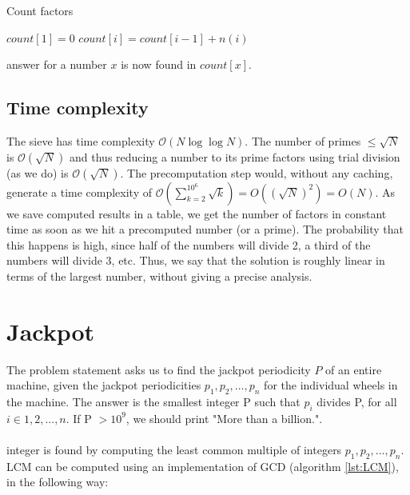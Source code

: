 \documentclass[11pt,a4paper,twoside]{article}
\begin{document}

\begin{algorithm}
    \caption{Count factors}
    \label{factorcount}
    \begin{algorithmic}
        \STATE $count[1] = 0$
            \STATE $count[i] = count[i-1] + n(i)$
        \ENDFOR
    \end{algorithmic}
\end{algorithm}

 answer for a number $x$ is now found in $count[x]$. 
\subsection{Time complexity}
The sieve has time complexity $\mathcal{O}(N\log{\log{N}})$. The number of
primes $\le \sqrt{N}$ is $\mathcal{O}(\sqrt{N})$ and thus reducing a number to
its prime factors using trial division (as we do) is $\mathcal{O}(\sqrt{N})$.
The precomputation step would, without any caching, generate a time complexity
of $\mathcal{O}(\sum_{k=2}^{10^{6}}\sqrt{k}) = O((\sqrt{N})^2) = O(N)$. As we
save computed results in a table, we get the number of factors in constant time
as soon as we hit a precomputed number (or a prime). The probability that this
happens is high, since half of the numbers will divide 2, a third of the
numbers will divide 3, etc. Thus, we say that the solution is roughly linear in
terms of the largest number, without giving a precise analysis.

\section{Jackpot}

The problem statement asks us to find the jackpot periodicity $P$ of an entire
machine, given the jackpot periodicities $p_{1},p_{2},...,p_{n}$ for the
individual wheels in the machine. The answer is the smallest integer P such
that $p_{i}$ divides P, for all $i \in {1,2,...,n}$. If P $> 10^{9}$, we should
print "More than a billion.".
\\\\
 integer is found by computing the least common multiple of
integers $p_{1},p_{2},...,p_{n}$. LCM can be computed using an implementation
of GCD (algorithm \ref{lst:LCM}), in the following way:
\end{document}
